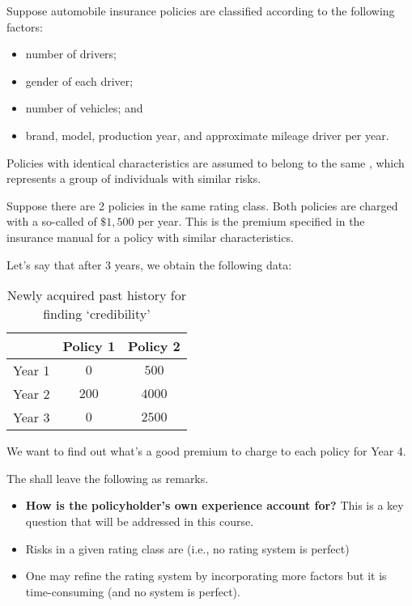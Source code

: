 \documentclass[notoc,notitlepage]{tufte-book}
\begin{document}
\begin{eg}
  Suppose automobile insurance policies are classified according to the
  following factors:
  \begin{itemize}
    \item number of drivers;
    \item gender of each driver;
    \item number of vehicles; and
    \item brand, model, production year, and approximate mileage driver per
      year.
  \end{itemize}
  Policies with identical characteristics are assumed to belong to the same
  , which represents a group of individuals with similar
  risks.

  Suppose there are 2 policies in the same rating class. Both policies are
  charged with a so-called  of $\$1,500$ per year. This
  is the premium specified in the insurance manual for a policy with similar
  characteristics.

  Let's say that after 3 years, we obtain the following data:
  \begin{table}[ht]
    \centering
    \caption{Newly acquired past history for finding `credibility'}
    \label{table:newly_acquired_past_history_for_finding_credibility_}
    \begin{tabular}{c | c c}
             & Policy 1 & Policy 2 \\
      \hline
      Year 1 & $0$      & $500$ \\
      Year 2 & $200$    & $4000$ \\
      Year 3 & $0$      & $2500$
    \end{tabular}
  \end{table}
  We want to find out what's a good premium to charge to each policy for Year 4.
\end{eg}

\begin{remark}
  The shall leave the following as remarks.
  \begin{itemize}
    \item \textbf{How is the policyholder's own experience account for?} This is
      a key question that will be addressed in this course.
    \item Risks in a given rating class are 
      (i.e., no rating system is perfect)
    \item One may refine the rating system by incorporating more factors but it
      is time-consuming (and no system is perfect).
  \end{itemize}
\end{remark}
\end{document}
